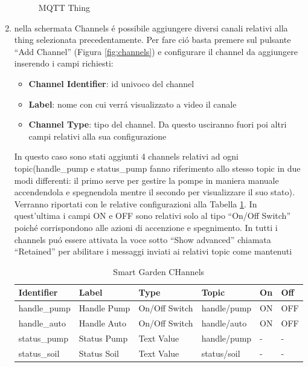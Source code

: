 \begin{enumerate}
\begin{figure}
        \caption{MQTT Thing}
        \label{fig:mqtt_thing_smart_garden}
    \end{figure}
    \item nella schermata Channels \'e possibile aggiungere diversi canali relativi alla thing selezionata precedentamente. Per fare ci\'o basta premere sul pulsante ``Add Channel'' (Figura \ref{fig:channels}) e configurare il channel da aggiungere inserendo i campi richiesti:
    \begin{itemize}
        \item \textbf{Channel Identifier}: id univoco del channel
        \item \textbf{Label}: nome con cui verr\'a visualizzato a video il canale
        \item \textbf{Channel Type}: tipo del channel. Da questo usciranno fuori poi altri campi relativi alla sua configurazione
    \end{itemize}
    In questo caso sono stati aggiunti 4 channels relativi ad ogni topic(handle\_pump e status\_pump fanno riferimento allo stesso topic in due modi differenti: il primo serve per gestire la pompe in maniera manuale accendendola e spegnendola mentre il secondo per visualizzare il suo stato). Verranno riportati con le relative configurazioni alla Tabella \ref{tab:smart_garden_channels}. In quest'ultima i campi ON e OFF sono relativi solo al tipo ``On/Off Switch'' poich\'e corrispondono alle azioni di accenzione e spegnimento. In tutti i channels pu\'o essere attivata la voce sotto ``Show advanced'' chiamata ``Retained'' per abilitare i messaggi inviati ai relativi topic come mantenuti
    \begin{table}[]
        \centering
        \begin{tabular}{l|l|l|l|l|l}
            \textbf{Identifier} & \textbf{Label} & \textbf{Type} & \textbf{Topic} & \textbf{On} & \textbf{Off} \\
            \hline
            handle\_pump & Handle Pump & On/Off Switch & handle/pump & ON & OFF \\
            handle\_auto & Handle Auto & On/Off Switch & handle/auto & ON & OFF \\
            status\_pump & Status Pump & Text Value & handle/pump & - & - \\
            status\_soil & Status Soil & Text Value & status/soil & - & - \\
        \end{tabular}
        \caption{Smart Garden CHannels}
        \label{tab:smart_garden_channels}

\end{table}
\end{enumerate}
